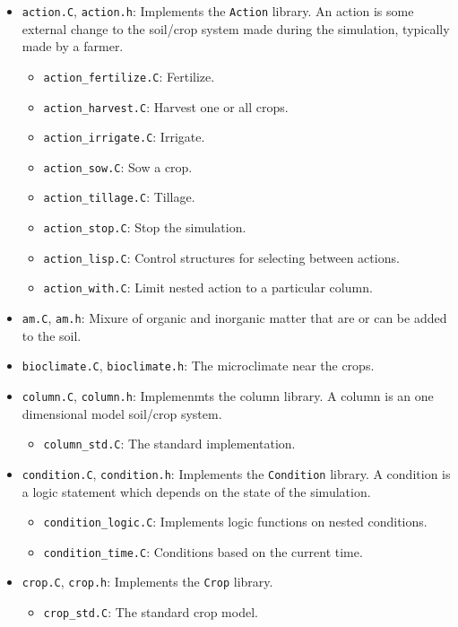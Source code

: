 \documentclass{article}
\newcommand{\code}[1]{\texttt{#1}}
\newcommand{\file}[1]{\texttt{#1}}
\begin{document}
\begin{itemize}
\item \file{action.C}, \file{action.h}: Implements the \code{Action}
  library.  An action is some external change to the soil/crop system
  made during the simulation, typically made by a farmer.
  \begin{itemize}
  \item \file{action\_fertilize.C}: Fertilize.
  \item \file{action\_harvest.C}: Harvest one or all crops.
  \item \file{action\_irrigate.C}: Irrigate.
  \item \file{action\_sow.C}: Sow a crop.
  \item \file{action\_tillage.C}: Tillage.
  \item \file{action\_stop.C}: Stop the simulation.
  \item \file{action\_lisp.C}: Control structures for selecting between
    actions.
  \item \file{action\_with.C}: Limit nested action to a particular
    column.
  \end{itemize}
\item \file{am.C}, \file{am.h}: Mixure of organic and inorganic
  matter that are or can be added to the soil.
\item \file{bioclimate.C}, \file{bioclimate.h}: The microclimate near
  the crops.
\item \file{column.C}, \file{column.h}:  Implemenmts the column
  library.  A column is an one dimensional model soil/crop system.
  \begin{itemize}
  \item \file{column\_std.C}: The standard implementation.
  \end{itemize}    
\item \file{condition.C}, \file{condition.h}:  Implements the
  \code{Condition} library.  A condition is a logic statement which
  depends on the state of the simulation.
  \begin{itemize}
  \item \file{condition\_logic.C}: Implements logic functions on nested
    conditions.
  \item \file{condition\_time.C}: Conditions based on the current time.
  \end{itemize}
\item \file{crop.C}, \file{crop.h}:  Implements the \code{Crop}
  library. 
  \begin{itemize}
  \item \file{crop\_std.C}: The standard crop model.

\end{itemize}
\end{itemize}
\end{document}
